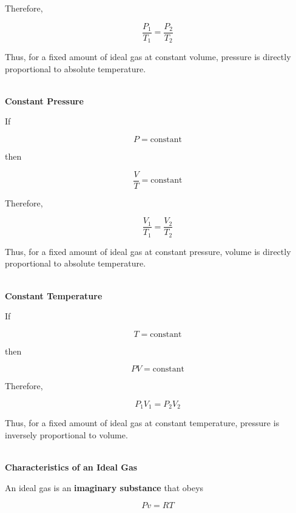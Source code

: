 \documentclass[12pt]{article}
\begin{document}
Therefore,

\begin{equation*}
\boxed{\frac{P_1}{T_1}=\frac{P_2}{T_2}}
\end{equation*}

Thus, for a fixed amount of ideal gas at constant volume, pressure is directly proportional to absolute temperature.

\textbf{\\ Constant Pressure}

If

\begin{equation*}
P=\text{constant}
\end{equation*}

then

\begin{equation*}
\boxed{\frac{V}{T}=\text{constant}}
\end{equation*}

Therefore,

\begin{equation*}
\boxed{\frac{V_1}{T_1}=\frac{V_2}{T_2}}
\end{equation*}

Thus, for a fixed amount of ideal gas at constant pressure, volume is directly proportional to absolute temperature.

\textbf{\\ Constant Temperature}

If

\begin{equation*}
T=\text{constant}
\end{equation*}

then

\begin{equation*}
\boxed{PV=\text{constant}}
\end{equation*}

Therefore,

\begin{equation*}
\boxed{P_1V_1=P_2V_2}
\end{equation*}

Thus, for a fixed amount of ideal gas at constant temperature, pressure is inversely proportional to volume.

\textbf{\\ Characteristics of an Ideal Gas}

An ideal gas is an \textbf{imaginary substance} that obeys

\begin{equation*}
Pv=RT
\end{equation*}
\end{document}
